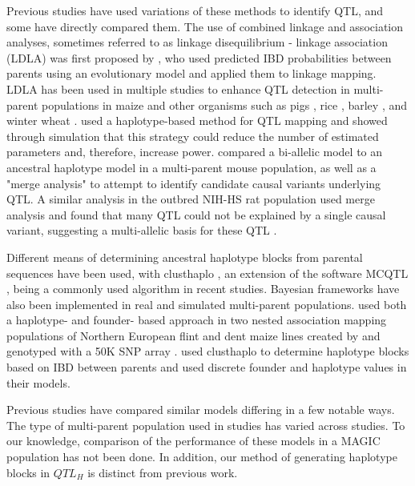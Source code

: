 \documentclass[9pt,twocolumn,twoside]{gsag3jnl}
\begin{document}
Previous studies have used variations of these methods to identify QTL, and some have directly compared them.
The use of combined linkage and association analyses, sometimes referred to as linkage disequilibrium - linkage association (LDLA) was first proposed by \cite{Meuwissen}, who used predicted IBD probabilities between parents using an evolutionary model and applied them to linkage mapping.
LDLA has been used in multiple studies to enhance QTL detection in multi-parent populations in maize \citep{Giraud2,Yu2,McMullen} and other organisms such as pigs \citep{Herault}, rice \citep{Zaw,Stadlmeier}, barley \citep{Sannemann}, and winter wheat \citep{Stadlmeier}.
\cite{Jansen} used a haplotype-based method for QTL mapping and showed through simulation that this strategy could reduce the number of estimated parameters and, therefore, increase power.
\cite{Yalcin} compared a bi-allelic model to an ancestral haplotype model in a multi-parent mouse population, as well as a "merge analysis" to attempt to identify candidate causal variants underlying QTL.
A similar analysis in the outbred NIH-HS rat population used merge analysis and found that many QTL could not be explained by a single causal variant, suggesting a multi-allelic basis for these QTL \citep{Baud}.

Different means of determining ancestral haplotype blocks from parental sequences have been used, with clusthaplo \citep{Leroux}, an extension of the software MCQTL \citep{Jourjon}, being a commonly used algorithm in recent studies.
Bayesian frameworks have also been implemented in real \citep{PerezEnciso} and simulated \citep{Bink} multi-parent populations.
\cite{Giraud} used both a haplotype- and founder- based approach in two nested association mapping populations of Northern European flint and dent maize lines created by \cite{Bauer} and genotyped with a 50K SNP array \citep{Ganal}.
\cite{Giraud} used clusthaplo to determine haplotype blocks based on IBD between parents and used discrete founder and haplotype values in their models.

Previous studies have compared similar models differing in a few notable ways.
The type of multi-parent population used in studies has varied across studies.
To our knowledge, comparison of the performance of these models in a MAGIC population has not been done.
In addition, our method of generating haplotype blocks in $QTL_H$ is distinct from previous work.
\end{document}
